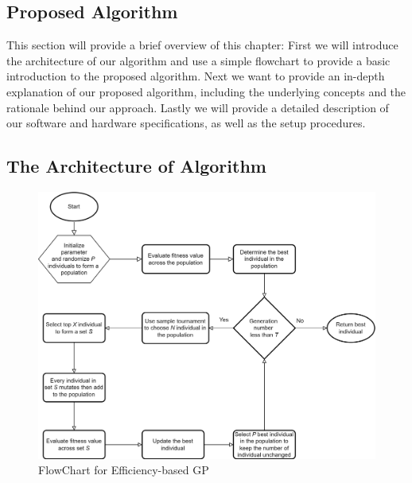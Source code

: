 \begin{ZhChapter}

\chapter{Proposed Algorithm}
This section will provide a brief overview of this chapter: First we will introduce the architecture of our algorithm and use a simple flowchart to provide a basic introduction to the proposed algorithm. Next we want to provide an in-depth explanation of our proposed algorithm, including the underlying concepts and the rationale behind our approach. Lastly we will provide a detailed description of our software and hardware specifications, as well as the setup procedures.
\section{The Architecture of Algorithm} %
\begin{figure}[htbp]
    \centering
    \includegraphics[width = 1\textwidth]{image/FlowChart.png}
    \caption{FlowChart for Efficiency-based GP}
    \label{fig: FlowChart}
\end{figure}



\end{ZhChapter}
